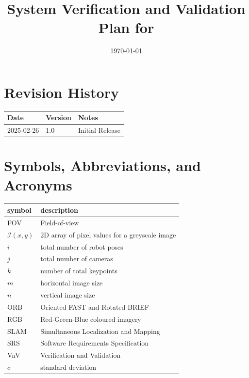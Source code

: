 \documentclass[12pt, titlepage]{article}
\begin{document}
\title{System Verification and Validation Plan for \progname{}} 
\author{\authname}
\date{\today}
	
\maketitle


\section*{Revision History}

\begin{tabularx}{\textwidth}{p{3cm}p{2cm}X}
\toprule {\bf Date} & {\bf Version} & {\bf Notes}\\
\midrule
2025-02-26 & 1.0 & Initial Release\\
\bottomrule
\end{tabularx}

\newpage

\tableofcontents
\listoftables
{}
\listoffigures
{}

\newpage

\section{Symbols, Abbreviations, and Acronyms}

\renewcommand{\arraystretch}{1.2}
\begin{tabular}{l l} 
  \toprule		
  \textbf{symbol} & \textbf{description}\\
  \midrule
  FOV & Field-of-view\\
  $\mathcal{I}(x,y)$ & 2D array of pixel values for a greyscale image \\
  $i$ & total number of robot poses\\
  $j$ & total number of cameras\\
  $k$ & number of total keypoints\\
  $m$ & horizontal image size\\
  $n$ & vertical image size\\
  ORB & Oriented FAST and Rotated BRIEF\\
  RGB & Red-Green-Blue coloured imagery\\
  SLAM & Simultaneous Localization and Mapping\\
  SRS & Software Requirements Specification\\
  VnV & Verification and Validation\\
  $\sigma$ & standard deviation\\
  \bottomrule
\end{tabular}\\
\end{document}
